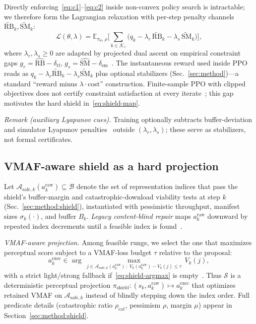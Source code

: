 \documentclass[preprint,12pt,times]{elsarticle}
\begin{document}
Directly enforcing~\eqref{eq:c1}--\eqref{eq:c2} inside non-convex policy search is intractable; we therefore form the Lagrangian relaxation with per-step penalty channels \(\widetilde{\mathrm{RB}}_k,\widetilde{\mathrm{SM}}_k\):
\begin{equation}
\label{eq:L}
    \mathcal{L}(\theta,\lambda) =
    \mathbb{E}_{\pi_\theta,\,\rho}\Big[\sum_{k\in\mathcal{K}_{e}} \big( q_k - \lambda_r\, \widetilde{\mathrm{RB}}_k - \lambda_s\, \widetilde{\mathrm{SM}}_k \big)\Big],
\end{equation}
where \(\lambda_r,\lambda_s\ge 0\) are adapted by projected dual ascent on empirical constraint gaps \(g_r=\hat{\mathrm{RB}}-\delta_{\mathrm{rf}}\), \(g_s=\hat{\mathrm{SM}}-\delta_{\mathrm{sm}}\)~\cite{paternain2019dual,altman1999constrained}.
The instantaneous reward used inside PPO reads as \(q_k - \lambda_r \widetilde{\mathrm{RB}}_k - \lambda_s \widetilde{\mathrm{SM}}_k\) plus optional stabilizers (Sec.~\ref{sec:method})---a standard ``reward minus \(\lambda\cdot\)cost'' construction.
Finite-sample PPO with clipped objectives does not certify constraint satisfaction at every iterate~\cite{schulman2017proximal,achiam2017constrained}; this gap motivates the hard shield in~\eqref{eq:shield-map}.

\emph{Remark (auxiliary Lyapunov cues).}
Training optionally subtracts buffer-deviation and simulator Lyapunov penalties~\cite{neely2010stochastic} outside \((\lambda_r,\lambda_s)\); these serve as stabilizers, not formal certificates.

\subsection{VMAF-aware shield as a hard projection}

Let \(\mathcal{A}_{\mathrm{safe},k}(a^{\mathrm{raw}}_k)\subseteq\mathcal{B}\) denote the set of representation indices that pass the shield's buffer-margin and catastrophic-download viability tests at step \(k\) (Sec.~\ref{sec:method:shield}), instantiated with pessimistic throughput, manifest sizes \(\sigma_k(\cdot)\), and buffer \(B_k\).
\emph{Legacy content-blind repair} maps \(a^{\mathrm{raw}}_k\) downward by repeated index decrements until a feasible index is found~\cite{alshiekh2018shielding}.

\emph{VMAF-aware projection.}
Among feasible rungs, we select the one that maximizes perceptual score subject to a VMAF-loss budget \(\tau\) relative to the proposal:
\begin{equation}
\label{eq:shield-argmax}
    a^{\mathrm{exec}}_k \in
    \arg\max_{\;j\in\mathcal{A}_{\mathrm{safe},k}(a^{\mathrm{raw}}_k)\,:\; V_k(a^{\mathrm{raw}}_k)-V_k(j)\le \tau\;}
    V_k(j),
\end{equation}
with a strict light/strong fallback if~\eqref{eq:shield-argmax} is empty~\cite{li2016vmaf}.
Thus \(\mathcal{S}\) is a deterministic perceptual projection \(\pi_{\mathrm{shield}}:(s_k,a^{\mathrm{raw}}_k)\mapsto a^{\mathrm{exec}}_k\) that optimizes retained VMAF on \(\mathcal{A}_{\mathrm{safe},k}\) instead of blindly stepping down the index order.
Full predicate details (catastrophic ratio \(\rho_{\mathrm{cat}}\), pessimism \(\rho\), margin \(\mu\)) appear in Section~\ref{sec:method:shield}.
\end{document}
